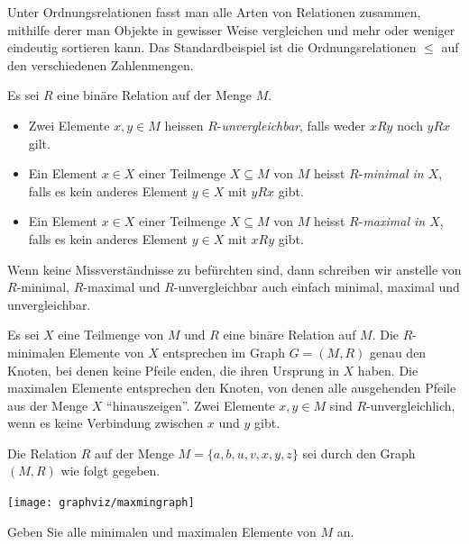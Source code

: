 Unter Ordnungsrelationen fasst man alle Arten von Relationen zusammen, mithilfe derer man
Objekte in gewisser Weise vergleichen und mehr oder weniger eindeutig sortieren kann. Das
Standardbeispiel ist die Ordnungsrelationen $\leq$ auf den verschiedenen Zahlenmengen.

\begin{df}\label{df:minimale elemente}
Es sei $R$ eine binäre Relation auf der Menge $M$.
\begin{itemize}
\item Zwei Elemente $x,y\in M$ heissen $R$-\textit{unvergleichbar}, falls weder $xRy$ noch $yRx$ gilt.
\item Ein Element $x\in X$ einer Teilmenge $X\subseteq M$ von $M$ heisst $R$-\textit{minimal in $X$}, falls es kein anderes Element $y\in X$ mit $yRx$ gibt.
\item  Ein Element $x\in X$ einer Teilmenge $X\subseteq M$ von $M$ heisst $R$-\textit{maximal in $X$}, falls es kein anderes Element $y\in X$ mit $xRy$ gibt.
\end{itemize}
Wenn keine Missverständnisse zu befürchten sind, dann schreiben wir anstelle von $R$-minimal, $R$-maximal und $R$-unvergleichbar auch einfach minimal, maximal und unvergleichbar.
\end{df}

\begin{rk}
Es sei $X$ eine Teilmenge von $M$ und $R$ eine binäre Relation auf $M$.
Die $R$-minimalen Elemente von $X$ entsprechen im Graph $G=(M,R)$ genau den Knoten, bei
denen keine Pfeile enden, die ihren Ursprung in $X$ haben. Die maximalen Elemente
entsprechen den Knoten, von denen alle ausgehenden Pfeile aus der Menge $X$
``hinauszeigen''. Zwei Elemente $x,y\in M$ sind $R$-unvergleichlich, wenn es keine
Verbindung zwischen $x$ und $y$ gibt.
\end{rk}

\begin{ueb}
Die Relation $R$ auf der Menge $M=\{a,b,u,v,x,y,z\}$ sei durch den Graph $(M,R)$ wie folgt
gegeben.
\begin{center}
\texttt{[image: graphviz/maxmingraph]}
\end{center}
Geben Sie alle minimalen und maximalen Elemente von $M$ an.
\end{ueb}
\begin{lsg}~
\end{lsg}

